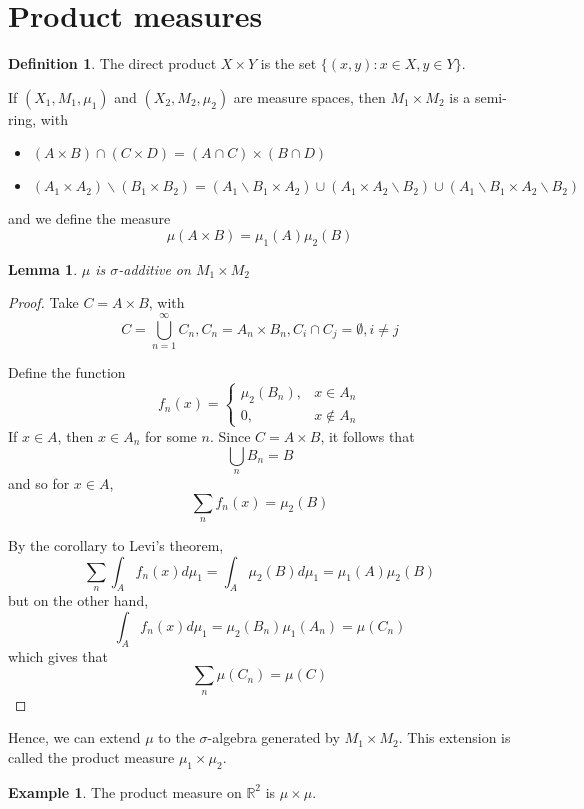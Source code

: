\documentclass[11pt,a4paper]{report}
\newtheorem{lemma}[theorem]{Lemma}
\theoremstyle{plain}
\theoremstyle{definition}
\newtheorem*{defn}{Definition}
\newtheorem*{eg}{Example}
\theoremstyle{remark}
\newcommand{\union}{\cup}
\newcommand{\intersection}{\cap}
\newcommand{\Union}{\bigcup}
\newcommand{\R}{\mathbb{R}}
\begin{document}
\section{Product measures}

\begin{defn}
    The direct product $X \times Y$ is the set $\{ (x, y) : x \in X, y \in Y \}$.
\end{defn}

If $(X_1, M_1, \mu_1)$ and $(X_2, M_2, \mu_2)$ are measure spaces, then $M_1 \times M_2$ is a semi-ring, with
\begin{itemize}
  \item $ (A \times B) \intersection (C \times D) = (A \intersection C) \times (B \intersection D) $
  \item $ (A_1 \times A_2) \backslash (B_1 \times B_2) = (A_1 \backslash B_1 \times A_2) \union (A_1 \times A_2 \backslash B_2) \union (A_1 \backslash B_1 \times A_2 \backslash B_2) $
\end{itemize}
and we define the measure 
$$ \mu(A \times B) = \mu_1(A)\mu_2(B) $$

\begin{lemma}
    $\mu$ is $\sigma$-additive on $M_1 \times M_2$
\end{lemma}

\begin{proof}
  Take $C = A \times B$, with 
  $$C = \Union_{n=1}^\infty C_n, C_n = A_n \times B_n, C_i \intersection C_j = \emptyset, i \ne j $$

  Define the function
    $$ f_n(x) = \begin{cases}
        \mu_2(B_n), &x \in A_n \\ 
        0, &x \not \in A_n
        \end{cases} $$
  If $x \in A$, then $x \in A_n$ for some $n$. Since $C = A \times B$, it follows that
  $$ \Union_n B_n = B$$
    and so for $x \in A$, 
    $$\sum_n f_n(x) = \mu_2(B)$$

  By the corollary to Levi's theorem,
  $$ \sum_n \int_A f_n(x) d\mu_1 = \int_A \mu_2(B) d\mu_1 = \mu_1(A)\mu_2(B) $$
  but on the other hand,
  $$ \int_A f_n(x) d\mu_1 = \mu_2(B_n)\mu_1(A_n) = \mu(C_n) $$
  which gives that
    $$ \sum_n \mu(C_n) = \mu(C) $$
\end{proof}

Hence, we can extend $\mu$ to the $\sigma$-algebra generated by $M_1 \times M_2$. This extension is called the product measure $\mu_1 \times \mu_2$.

\begin{eg}
  The product measure on $\R^2$ is $\mu \times \mu$.
\end{eg}
\end{document}
